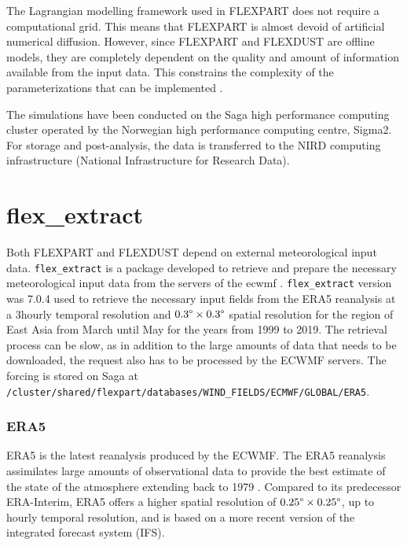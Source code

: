The Lagrangian modelling framework used in FLEXPART does not require a computational grid. This means that FLEXPART is almost devoid of artificial numerical diffusion. 
However, since  FLEXPART and FLEXDUST are offline models, they are completely dependent on the quality and amount of information available from the input data. This constrains the complexity of the parameterizations that can be implemented \parencite{flexpart_wetdep}. 

The simulations have been conducted on the Saga high performance computing cluster operated by the Norwegian high performance 
computing centre, Sigma2. For storage and post-analysis, the data is transferred to the 
NIRD computing infrastructure (National Infrastructure for Research Data). 

\section{flex\_extract}
Both FLEXPART and FLEXDUST depend on external meteorological input data. \verb|flex_extract| is a package developed to retrieve and prepare the necessary meteorological input data from the servers of the \acrfull{ecwmf} \parencite{tipka_flex_extract_2020}. 
\verb|flex_extract| version was 7.0.4 used to retrieve the necessary input fields from the ERA5 reanalysis  at a 3hourly temporal resolution and $0.3\degree \times 0.3\degree$ spatial resolution for the region of East Asia from March until May for the years from 1999 to 2019. 
The retrieval process can be slow, as in addition to the large amounts of data that needs to be downloaded, the request also has to be processed by the ECWMF servers.
The forcing is stored on Saga at \verb|/cluster/shared/flexpart/databases/WIND_FIELDS/ECMWF/GLOBAL/ERA5|.

\subsubsection{ERA5}
ERA5 is the latest reanalysis produced by the ECWMF. 
The ERA5 reanalysis assimilates large amounts of observational data to provide the best estimate of the state of the atmosphere extending back to 1979 \parencite{hersbach_era5_2020}. Compared to its predecessor ERA-Interim, ERA5 offers a higher spatial resolution of $0.25\degree \times 0.25\degree$, up to hourly temporal resolution, and is based on a more recent version of the integrated forecast system (IFS). 

